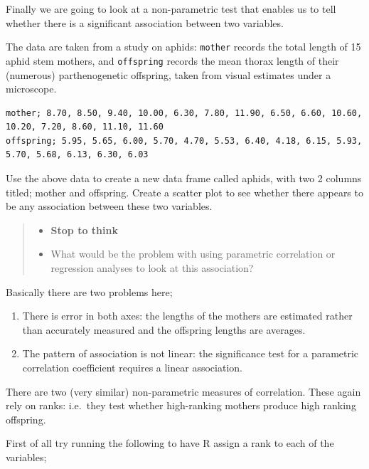 \documentclass[
]{book}
\newenvironment{Shaded}{\begin{snugshade}}{\end{snugshade}}
\newcommand{\AttributeTok}[1]{\textcolor[rgb]{0.13,0.29,0.53}{#1}}
\newcommand{\FunctionTok}[1]{\textcolor[rgb]{0.13,0.29,0.53}{\textbf{#1}}}
\newcommand{\NormalTok}[1]{#1}
\newcommand{\OtherTok}[1]{\textcolor[rgb]{0.56,0.35,0.01}{#1}}
\newcommand{\SpecialCharTok}[1]{\textcolor[rgb]{0.81,0.36,0.00}{\textbf{#1}}}
\providecommand{\tightlist}{%
  \setlength{\itemsep}{0pt}\setlength{\parskip}{0pt}}
\begin{document}
Finally we are going to look at a non-parametric test that enables us to tell whether there is a significant association between two variables.

The data are taken from a study on aphids: \texttt{mother} records the total length of 15 aphid stem mothers, and \texttt{offspring} records the mean thorax length of their (numerous) parthenogenetic offspring, taken from visual estimates under a microscope.

\begin{verbatim}
mother; 8.70, 8.50, 9.40, 10.00, 6.30, 7.80, 11.90, 6.50, 6.60, 10.60, 10.20, 7.20, 8.60, 11.10, 11.60 
offspring; 5.95, 5.65, 6.00, 5.70, 4.70, 5.53, 6.40, 4.18, 6.15, 5.93, 5.70, 5.68, 6.13, 6.30, 6.03 
\end{verbatim}

Use the above data to create a new data frame called aphids, with two 2 columns titled; mother and offspring. Create a scatter plot to see whether there appears to be any association between these two variables.

\begin{quote}
\begin{itemize}
\tightlist
\item
  \textbf{Stop to think}
\item
  What would be the problem with using parametric correlation or regression analyses to look at this association?
\end{itemize}
\end{quote}

Basically there are two problems here;

\begin{enumerate}
\def\labelenumi{\arabic{enumi})}
\tightlist
\item
  There is error in both axes: the lengths of the mothers are estimated rather than accurately measured and the offspring lengths are averages.
\item
  The pattern of association is not linear: the significance test for a parametric correlation coefficient requires a linear association.
\end{enumerate}

There are two (very similar) non-parametric measures of correlation. These again rely on ranks: i.e.~they test whether high-ranking mothers produce high ranking offspring.

First of all try running the following to have R assign a rank to each of the variables;

\begin{Shaded}
\end{Shaded}
\end{document}
